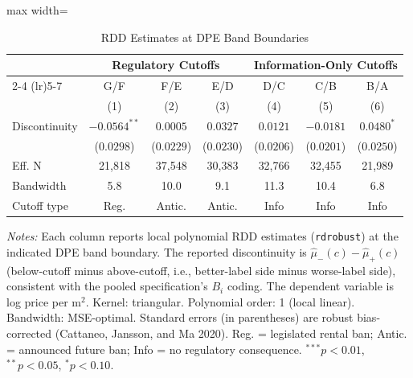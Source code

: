 \begin{table}[htbp]
\centering
\caption{RDD Estimates at DPE Band Boundaries}
\label{tab:main_rdd}
\begin{adjustbox}{max width=\textwidth}
\begin{tabular}{l c c c c c c}
\hline\hline
 & \multicolumn{3}{c}{Regulatory Cutoffs} & \multicolumn{3}{c}{Information-Only Cutoffs} \\
\cmidrule(lr){2-4} \cmidrule(lr){5-7}
 & G/F & F/E & E/D & D/C & C/B & B/A \\
 & (1) & (2) & (3) & (4) & (5) & (6) \\
\hline
Discontinuity & $-0.0564^{**}$ & $0.0005$ & $0.0327$ & $0.0121$ & $-0.0181$ & $0.0480^{*}$ \\
 & ($0.0298$) & ($0.0229$) & ($0.0230$) & ($0.0206$) & ($0.0201$) & ($0.0250$) \\
\hline
Eff. N & 21,818 & 37,548 & 30,383 & 32,766 & 32,455 & 21,989 \\
Bandwidth & 5.8 & 10.0 & 9.1 & 11.3 & 10.4 & 6.8 \\
Cutoff type & Reg. & Antic. & Antic. & Info & Info & Info \\
\hline\hline
\end{tabular}
\end{adjustbox}
\begin{minipage}{\textwidth}
\small\textit{Notes:} Each column reports local polynomial RDD estimates (\texttt{rdrobust}) at the indicated DPE band boundary. The reported discontinuity is $\hat{\mu}_-(c) - \hat{\mu}_+(c)$ (below-cutoff minus above-cutoff, i.e., better-label side minus worse-label side), consistent with the pooled specification's $B_i$ coding. The dependent variable is log price per m$^2$. Kernel: triangular. Polynomial order: 1 (local linear). Bandwidth: MSE-optimal. Standard errors (in parentheses) are robust bias-corrected (Cattaneo, Jansson, and Ma 2020). Reg. = legislated rental ban; Antic. = announced future ban; Info = no regulatory consequence. $^{***}p<0.01$, $^{**}p<0.05$, $^{*}p<0.10$.
\end{minipage}
\end{table}
